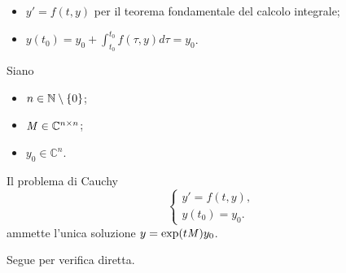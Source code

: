\begin{itemize}
	\item $y' = f(t,y)$ per il teorema fondamentale del calcolo integrale;
	\item $y(t_0) = y_0 + \int_{t_0}^{t_0} f(\tau,y)d\tau = y_0$. \EndProof
\end{itemize}
\begin{Theorem}
  Siano
  \begin{itemize}
    \item $n \in \mathbb{N} \setminus \lbrace 0 \rbrace$;
    \item $\mathit{M} \in \mathbb{C}^{n \times n}$;
    \item $y_0 \in \mathbb{C}^n$.
  \end{itemize}
  Il problema di Cauchy
	\[
		\begin{cases}
			y' = f(t,y),\\
			y(t_0) = y_0.
		\end{cases}
	\]
  ammette l'unica soluzione
  $y = \text{exp}(t \mathit{M})y_0$.
\end{Theorem}
\Proof Segue per verifica diretta. \EndProof
